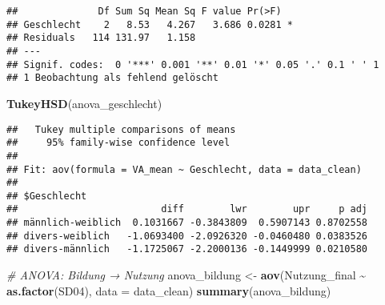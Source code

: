 \documentclass[
]{article}
\newenvironment{Shaded}{\begin{snugshade}}{\end{snugshade}}
\newcommand{\AttributeTok}[1]{\textcolor[rgb]{0.13,0.29,0.53}{#1}}
\newcommand{\CommentTok}[1]{\textcolor[rgb]{0.56,0.35,0.01}{\textit{#1}}}
\newcommand{\DecValTok}[1]{\textcolor[rgb]{0.00,0.00,0.81}{#1}}
\newcommand{\FunctionTok}[1]{\textcolor[rgb]{0.13,0.29,0.53}{\textbf{#1}}}
\newcommand{\NormalTok}[1]{#1}
\newcommand{\OtherTok}[1]{\textcolor[rgb]{0.56,0.35,0.01}{#1}}
\newcommand{\SpecialCharTok}[1]{\textcolor[rgb]{0.81,0.36,0.00}{\textbf{#1}}}
\newcommand{\StringTok}[1]{\textcolor[rgb]{0.31,0.60,0.02}{#1}}
\begin{document}
\begin{Shaded}
\end{Shaded}

\begin{verbatim}
##              Df Sum Sq Mean Sq F value Pr(>F)  
## Geschlecht    2   8.53   4.267   3.686 0.0281 *
## Residuals   114 131.97   1.158                 
## ---
## Signif. codes:  0 '***' 0.001 '**' 0.01 '*' 0.05 '.' 0.1 ' ' 1
## 1 Beobachtung als fehlend gelöscht
\end{verbatim}

\begin{Shaded}
\begin{Highlighting}[]
\FunctionTok{TukeyHSD}\NormalTok{(anova\_geschlecht)}
\end{Highlighting}
\end{Shaded}

\begin{verbatim}
##   Tukey multiple comparisons of means
##     95% family-wise confidence level
## 
## Fit: aov(formula = VA_mean ~ Geschlecht, data = data_clean)
## 
## $Geschlecht
##                         diff        lwr        upr     p adj
## männlich-weiblich  0.1031667 -0.3843809  0.5907143 0.8702558
## divers-weiblich   -1.0693400 -2.0926320 -0.0460480 0.0383526
## divers-männlich   -1.1725067 -2.2000136 -0.1449999 0.0210580
\end{verbatim}

\begin{Shaded}
\begin{Highlighting}[]
\CommentTok{\# ANOVA: Bildung → Nutzung}
\NormalTok{anova\_bildung }\OtherTok{\textless{}{-}} \FunctionTok{aov}\NormalTok{(Nutzung\_final }\SpecialCharTok{\textasciitilde{}} \FunctionTok{as.factor}\NormalTok{(SD04), }\AttributeTok{data =}\NormalTok{ data\_clean)}
\FunctionTok{summary}\NormalTok{(anova\_bildung)}
\end{Highlighting}
\end{Shaded}
\end{document}
